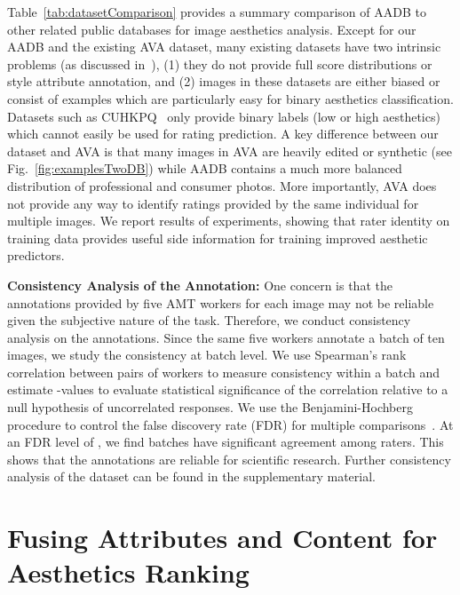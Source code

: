 \documentclass[runningheads]{llncs}
\begin{document}
Table~\ref{tab:datasetComparison} provides a summary comparison of AADB to other related public databases for image aesthetics analysis.
Except for our AADB and the existing AVA dataset, many existing datasets have
two intrinsic problems (as discussed in~\cite{murray2012ava}),
(1) they do not provide full score distributions or style attribute annotation,
and (2) images in these datasets are either biased or consist of examples which
are particularly easy for binary aesthetics classification. Datasets such as
CUHKPQ~\cite{ke2006design,luo2008photo} only
provide binary labels (low or high aesthetics) which cannot easily be used for
rating prediction. A key difference between our dataset and AVA is that many
images in AVA are heavily edited or synthetic (see
Fig.~\ref{fig:examplesTwoDB}) while AADB contains a much more balanced distribution of professional and consumer photos.
More importantly, AVA does not provide any way to identify ratings provided by
the same individual for multiple images. We report results of experiments, showing that
rater identity on training data provides useful side information for training
improved aesthetic predictors.

\vspace{2mm}
\noindent \textbf{Consistency Analysis of the Annotation:}
One concern is that the annotations provided by five AMT workers for each
image may not be reliable given the subjective nature of the task.
Therefore, we conduct consistency analysis on the annotations.
Since the same five workers annotate a batch of ten images,
we study the consistency at batch level.  We use Spearman's rank correlation
 between pairs of workers to measure consistency within a batch and
estimate -values to evaluate statistical significance of the correlation
relative to a null hypothesis of uncorrelated responses.  We use the
Benjamini-Hochberg procedure to control the false discovery rate (FDR) for
multiple comparisons~\cite{benjamini2001control}.  At an FDR level of ,
we find  batches have significant agreement among raters.  This shows
that the annotations are reliable for scientific research.  Further consistency
analysis of the dataset can be found in the supplementary material.





\section{Fusing Attributes and Content for Aesthetics Ranking}
\label{sec:ourModels}
\end{document}
